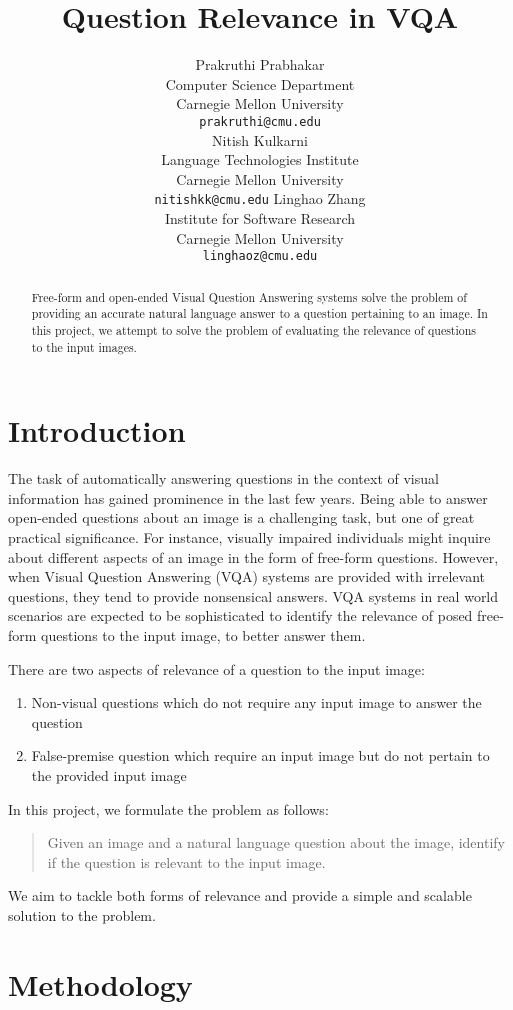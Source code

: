 \documentclass{article}
\title{Question Relevance in VQA}
\author{
  Prakruthi Prabhakar\\
  Computer Science Department\\
  Carnegie Mellon University\\
  \texttt{prakruthi@cmu.edu} \\
  \And
  Nitish Kulkarni\\
  Language Technologies Institute\\
  Carnegie Mellon University\\
  \texttt{nitishkk@cmu.edu}
  \And
  Linghao Zhang\\
  Institute for Software Research\\
  Carnegie Mellon University\\
  \texttt{linghaoz@cmu.edu}
}
\begin{document}
\maketitle

\begin{abstract}
	Free-form and open-ended Visual Question Answering systems solve the problem of providing an accurate natural language answer to a question pertaining to an image. In this project, we attempt to solve the problem of evaluating the relevance of questions to the input images.
\end{abstract}

\section{Introduction}
The task of automatically answering questions in the context of visual information has gained prominence in the last few years. Being able to answer open-ended questions about an image is a challenging task, but one of great practical significance. For instance, visually impaired individuals might inquire about different aspects of an image in the form of free-form questions. However, when Visual Question Answering (VQA) systems are provided with irrelevant questions, they tend to provide nonsensical answers. VQA systems in real world scenarios are expected to be sophisticated to identify the relevance of posed free-form questions to the input image, to better answer them. 

There are two aspects of relevance of a question to the input image:
\begin{enumerate}
\item Non-visual questions which do not require any input image to answer the question
\item False-premise question which require an input image but do not pertain to the provided input image \\
\end{enumerate}

In this project, we formulate the problem as follows:
\begin{quotation}
\noindent Given an image and a natural language question about the image, identify if the question is relevant to the input image.
\end{quotation}
We aim to tackle both forms of relevance and provide a simple and scalable solution to the problem. 

\section{Methodology}
\end{document}
